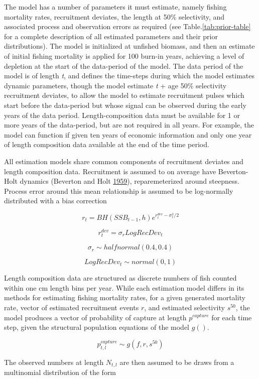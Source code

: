 \documentclass[twoside,12pt,final]{ucthesis-CA2012}
\begin{document}
\begin{ucmainmatter}
The model has a number of parameters it must estimate, namely fishing
mortality rates, recruitment deviates, the length at 50\% selectivity,
and associated process and observation errors as required (see
Table.\ref{tab:prior-table} for a complete description of all estimated
parameters and their prior distributions). The model is initialized at
unfished biomass, and then an estimate of initial fishing mortality is
applied for 100 burn-in years, achieving a level of depletion at the
start of the data-period of the model. The data period of the model is
of length \emph{t}, and defines the time-steps during which the model
estimates dynamic parameters, though the model estimate \emph{t} + age
50\% selectivity recruitment deviates, to allow the model to estimate
recruitment pulses which start before the data-period but whose signal
can be observed during the early years of the data period.
Length-composition data must be available for 1 or more years of the
data-period, but are not required in all years. For example, the model
can function if given ten years of economic information and only one
year of length composition data available at the end of the time period.

All estimation models share common components of recruitment deviates
and length composition data. Recruitment is assumed to on average have
Beverton-Holt dynamics (Beverton and Holt
\protect\hyperlink{ref-Beverton1959}{1959}), reparemeterized around
steepness. Process error around this mean relationship is assumed to be
log-normally distributed with a bias correction

\[r_{t} = BH(SSB_{t-1},h)e^{r^{dev}_{t}-\sigma_{r}^2/2}\]

\[r^{dev}_{t} = \sigma_rLogRecDev_t\]

\[\sigma_r \sim halfnormal(0.4,0.4)\]

\[LogRecDev_t\sim normal(0,1)\]

Length composition data are structured as discrete numbers of fish
counted within one cm length bins per year. While each estimation model
differs in its methods for estimating fishing mortality rates, for a
given generated mortality rate, vector of estimated recruitment events
\(r\), and estimated selectivity \(s^{50}\), the model produces a vector
of probability of capture at length \(p^{capture}\) for each time step,
given the structural population equations of the model \(g()\).

\[p^{capture}_{t,l} \sim g(f, r, s^{50})\]

The observed numbers at length \(N_{t,l}\) are then assumed to be draws
from a multinomial distribution of the form


\end{ucmainmatter}
\end{document}
